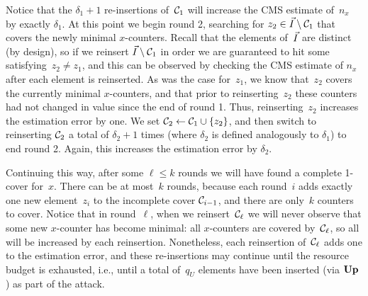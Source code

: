 Notice that the $\delta_1+1$ re-insertions of~$\mathcal{C}_1$ will increase the CMS estimate of~$n_x$ by exactly $\delta_1$. At this point we begin round 2, searching for $z_2 \in \vec{I}\setminus\mathcal{C}_1$ that covers the newly minimal $x$-counters.  Recall that the elements of~$\vec{I}$ are distinct (by design), so if we reinsert $\vec{I}\setminus\mathcal{C}_1$ in order we are guaranteed to hit some satisfying~$z_2 \neq z_1$, and this can be observed by checking the CMS estimate of $n_x$ after each element is reinserted.  As was the case for~$z_1$, we know that~$z_2$ covers the currently minimal $x$-counters, and that prior to reinserting~$z_2$ these counters had not changed in value since the end of round 1.  Thus, reinserting~$z_2$ increases the estimation error by one.  We set $\mathcal{C}_2 \gets \mathcal{C}_1 \cup \{z_2\}$, and then switch to reinserting $\mathcal{C}_2$ a total of $\delta_2+1$ times (where $\delta_2$ is defined analogously to $\delta_1$) to end round 2.  Again, this increases the estimation error by $\delta_2$.

Continuing this way, after some $\ell \leq k$ rounds we will have found a complete 1-cover for~$x$.  There can be at most~$k$ rounds, because each round~$i$ adds exactly one new element~$z_i$ to the incomplete cover $\mathcal{C}_{i-1}$, and there are only~$k$ counters to cover.  Notice that in round~$\ell$, when we reinsert~$\mathcal{C}_\ell$ we will never observe that some new $x$-counter has become minimal: all $x$-counters are covered by~$\mathcal{C}_\ell$, so all will be increased by each reinsertion.  Nonetheless, each reinsertion of~$\mathcal{C}_\ell$ adds one to the estimation error, and these re-insertions may continue until the resource budget is exhausted, i.e., until a total of~$q_U$ elements have been inserted (via $\textup{\textbf{Up}}\hspace{0.5pt}$) as part of the attack.

